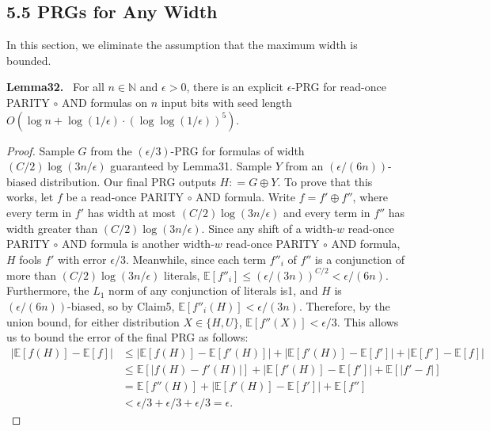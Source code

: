 \documentclass[10pt,a4paper]{article}
\newenvironment{authorclaim}[1]{\par\medskip\noindent\textbf{#1.}\ \ignorespaces}{\par\medskip}
\begin{document}
\subsection*{5.5 PRGs for Any Width}
In this section, we eliminate the assumption that the maximum width is bounded.
\begin{authorclaim}{Lemma32}
For all $n\in\mathbb N$ and $\epsilon>0$, there is an explicit $\epsilon$-PRG for read-once PARITY $\circ$ AND formulas on $n$ input bits with seed length $O(\log n+\log(1/\epsilon)\cdot(\log\log(1/\epsilon))^5)$.
\end{authorclaim}
\begin{proof}
Sample $G$ from the $(\epsilon/3)$-PRG for formulas of width $(C/2)\log(3n/\epsilon)$ guaranteed by Lemma31. Sample $Y$ from an $(\epsilon/(6n))$-biased distribution. Our final PRG outputs $H\mathrel{\mathop:}=G\oplus Y$.
To prove that this works, let $f$ be a read-once PARITY $\circ$ AND formula. Write $f=f'\oplus f''$, where every term in $f'$ has width at most $(C/2)\log(3n/\epsilon)$ and every term in $f''$ has width greater than $(C/2)\log(3n/\epsilon)$.
Since any shift of a width-$w$ read-once PARITY $\circ$ AND formula is another width-$w$ read-once PARITY $\circ$ AND formula, $H$ fools $f'$ with error $\epsilon/3$. Meanwhile, since each term $f''_i$ of $f''$ is a conjunction of more than $(C/2)\log(3n/\epsilon)$ literals, $\mathbb E[f''_i]\le(\epsilon/(3n))^{C/2}<\epsilon/(6n)$.
Furthermore, the $L_1$ norm of any conjunction of literals is1, and $H$ is $(\epsilon/(6n))$-biased, so by Claim5, $\mathbb E[f''_i(H)]<\epsilon/(3n)$. Therefore, by the union bound, for either distribution $X\in\{H,U\}$, $\mathbb E[f''(X)]<\epsilon/3$.
This allows us to bound the error of the final PRG as follows:
\begin{align*}
|\mathbb E[f(H)]-\mathbb E[f]|
&\le|\mathbb E[f(H)]-\mathbb E[f'(H)]|+|\mathbb E[f'(H)]-\mathbb E[f']|+|\mathbb E[f']-\mathbb E[f]|\\
&\le\mathbb E[|f(H)-f'(H)|]+|\mathbb E[f'(H)]-\mathbb E[f']|+\mathbb E[|f'-f|]\\
&=\mathbb E[f''(H)]+|\mathbb E[f'(H)]-\mathbb E[f']|+\mathbb E[f'']\\
&<\epsilon/3+\epsilon/3+\epsilon/3=\epsilon.
\end{align*}
\end{proof}
\end{document}
